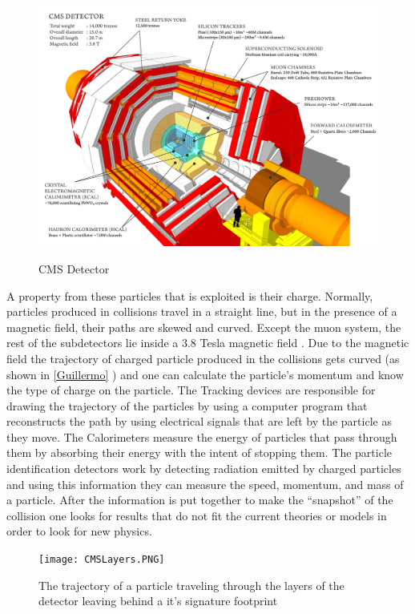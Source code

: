 \begin{figure}
\includegraphics[width=\linewidth]{CMSLayout.png}
\label{Guillermo}
\caption{CMS Detector \label{test}}
\end{figure}

A property from these particles that is exploited is their charge. Normally, particles produced in collisions travel in a straight line, but in the presence of a magnetic field, their paths are skewed and curved. Except the muon system, the rest of the subdetectors lie inside a 3.8 Tesla magnetic field . Due to the magnetic field the trajectory of charged particle produced in the collisions gets curved  (as shown in \autoref{Guillermo} ) and one can calculate the particle’s momentum and know the type of charge on the particle.  The Tracking devices are responsible for drawing the trajectory of the particles by using a computer program that reconstructs the path by using electrical signals that are left by the particle as they move.  The Calorimeters measure the energy of particles that pass through them by absorbing their energy with the intent of stopping them. The particle identification detectors work by detecting radiation emitted by charged particles and using this information they can measure the speed, momentum, and mass of a particle. After the information is put together to make the “snapshot” of the collision one looks for results that do not fit the current theories or models in order to look for new physics.

\begin{figure}
\texttt{[image: CMSLayers.PNG]}
\label{CMSLayers}
\caption{The trajectory of a particle traveling through the layers of the detector leaving behind a it's signature footprint}
\end{figure}


